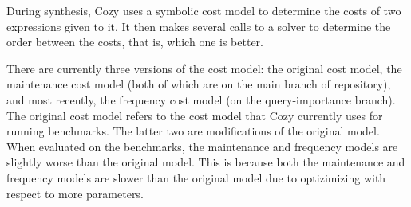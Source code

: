 During synthesis, Cozy uses a symbolic cost model to determine the costs of two
expressions given to it. It then makes several calls to a solver to determine
the order between the costs, that is, which one is better.

There are currently three versions of the cost model: the original cost model,
the maintenance cost model (both of which are on the main branch of repository),
and most recently, the frequency cost model (on the query-importance branch).
The original cost model refers to the cost model that Cozy currently uses for
running benchmarks. The latter two are modifications of the original model.
When evaluated on the benchmarks, the maintenance and frequency models are
slightly worse than the original model. This is because both the maintenance and
frequency models are slower than the original model due to optizimizing with
respect to more parameters.
